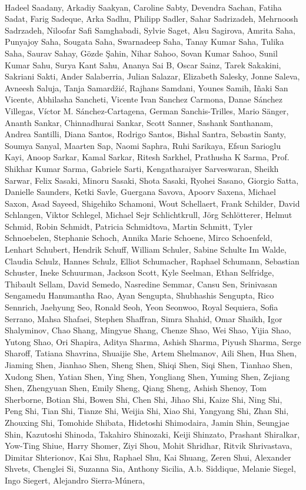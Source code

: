 \paragraph{}Hadeel Saadany, Arkadiy Saakyan, Caroline Sabty, Devendra Sachan, Fatiha Sadat, Farig Sadeque, Arka Sadhu, Philipp Sadler, Sahar Sadrizadeh, Mehrnoosh Sadrzadeh, Niloofar Safi Samghabadi, Sylvie Saget, Alsu Sagirova, Amrita Saha, Punyajoy Saha, Sougata Saha, Swarnadeep Saha, Tanay Kumar Saha, Tulika Saha, Saurav Sahay, Gözde Şahin, Nihar Sahoo, Sovan Kumar Sahoo, Sunil Kumar Sahu, Surya Kant Sahu, Ananya Sai B, Oscar Sainz, Tarek Sakakini, Sakriani Sakti, Ander Salaberria, Julian Salazar, Elizabeth Salesky, Jonne Saleva, Avneesh Saluja, Tanja Samardžić, Rajhans Samdani, Younes Samih, Iñaki San Vicente, Abhilasha Sancheti, Vicente Ivan Sanchez Carmona, Danae Sánchez Villegas, Víctor M. Sánchez-Cartagena, German Sanchis-Trilles, Mario Sänger, Ananth Sankar, Chinnadhurai Sankar, Scott Sanner, Sashank Santhanam, Andrea Santilli, Diana Santos, Rodrigo Santos, Bishal Santra, Sebastin Santy, Soumya Sanyal, Maarten Sap, Naomi Saphra, Ruhi Sarikaya, Efsun Sarioglu Kayi, Anoop Sarkar, Kamal Sarkar, Ritesh Sarkhel, Prathusha K Sarma, Prof. Shikhar Kumar Sarma, Gabriele Sarti, Kengatharaiyer Sarveswaran, Sheikh Sarwar, Felix Sasaki, Minoru Sasaki, Shota Sasaki, Ryohei Sasano, Giorgio Satta, Danielle Saunders, Ketki Savle, Guergana Savova, Apoorv Saxena, Michael Saxon, Asad Sayeed, Shigehiko Schamoni, Wout Schellaert, Frank Schilder, David Schlangen, Viktor Schlegel, Michael Sejr Schlichtkrull, Jörg Schlötterer, Helmut Schmid, Robin Schmidt, Patricia Schmidtova, Martin Schmitt, Tyler Schnoebelen, Stephanie Schoch, Annika Marie Schoene, Mirco Schoenfeld, Lenhart Schubert, Hendrik Schuff, William Schuler, Sabine Schulte Im Walde, Claudia Schulz, Hannes Schulz, Elliot Schumacher, Raphael Schumann, Sebastian Schuster, Ineke Schuurman, Jackson Scott, Kyle Seelman, Ethan Selfridge, Thibault Sellam, David Semedo, Nasredine Semmar, Cansu Sen, Srinivasan Sengamedu Hanumantha Rao, Ayan Sengupta, Shubhashis Sengupta, Rico Sennrich, Jaehyung Seo, Ronald Seoh, Yeon Seonwoo, Royal Sequiera, Sofia Serrano, Mahsa Shafaei, Stephen Shaffran, Simra Shahid, Omar Shaikh, Igor Shalyminov, Chao Shang, Mingyue Shang, Chenze Shao, Wei Shao, Yijia Shao, Yutong Shao, Ori Shapira, Aditya Sharma, Ashish Sharma, Piyush Sharma, Serge Sharoff, Tatiana Shavrina, Shuaijie She, Artem Shelmanov, Aili Shen, Hua Shen, Jiaming Shen, Jianhao Shen, Sheng Shen, Shiqi Shen, Siqi Shen, Tianhao Shen, Xudong Shen, Yatian Shen, Ying Shen, Yongliang Shen, Yuming Shen, Zejiang Shen, Zhengyuan Shen, Emily Sheng, Qiang Sheng, Ashish Shenoy, Tom Sherborne, Botian Shi, Bowen Shi, Chen Shi, Jihao Shi, Kaize Shi, Ning Shi, Peng Shi, Tian Shi, Tianze Shi, Weijia Shi, Xiao Shi, Yangyang Shi, Zhan Shi, Zhouxing Shi, Tomohide Shibata, Hidetoshi Shimodaira, Jamin Shin, Seungjae Shin, Kazutoshi Shinoda, Takahiro Shinozaki, Keiji Shinzato, Prashant Shiralkar, Yow-Ting Shiue, Harry Shomer, Ziyi Shou, Mohit Shridhar, Ritvik Shrivastava, Dimitar Shterionov, Kai Shu, Raphael Shu, Kai Shuang, Zeren Shui, Alexander Shvets, Chenglei Si, Suzanna Sia, Anthony Sicilia, A.b. Siddique, Melanie Siegel, Ingo Siegert, Alejandro Sierra-Múnera, 